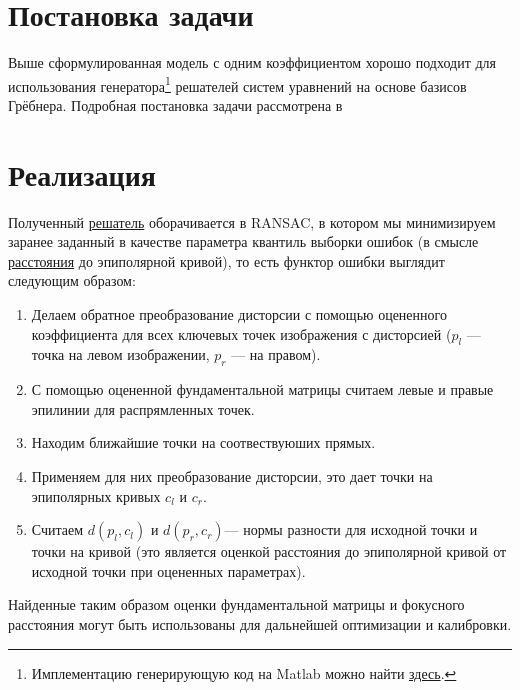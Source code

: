 \label{groebner}
\section{Постановка задачи}

Выше сформулированная модель с одним коэффициентом хорошо подходит для использования генератора\footnote{ Имплементацию генерирующую код на Matlab можно найти \href{https://github.com/PavelTrutman/Automatic-Generator}{здесь}.} решателей систем уравнений на основе базисов Грёбнера. Подробная постановка задачи рассмотрена в \cite[p.~121-149]{KukelovaPhD}


\section{Реализация}

Полученный \href{https://github.com/QuantumMechanicus/camera_calibration/blob/dev/subroutines/distortion_groebner_estimator/Groebner_Estimator.cpp#L125}{решатель} оборачивается в RANSAC, в котором мы минимизируем заранее заданный в качестве параметра квантиль выборки ошибок (в смысле \href{https://github.com/QuantumMechanicus/camera_calibration/blob/dev/core/utils/Functors.h#L11}{расстояния} до эпиполярной кривой), то есть функтор ошибки выглядит следующим образом:
\begin{enumerate}
	\item Делаем обратное преобразование дисторсии с помощью оцененного коэффициента для всех ключевых точек изображения с дисторсией ($p_l$ --- точка на левом изображении, $p_r$ --- на правом).
	\item С помощью оцененной фундаментальной  матрицы считаем левые и правые эпилинии для распрямленных точек.
	\item Находим ближайшие точки на соотвествуюших прямых.
	\item Применяем для них преобразование дисторсии, это дает точки на эпиполярных кривых $c_l$ и $c_r$.
	\item Считаем $d\left(p_l, c_l\right)$ и $d\left(p_r, c_r\right)$--- нормы разности для исходной точки и точки на кривой (это является оценкой расстояния до эпиполярной кривой от исходной точки при оцененных параметрах). 
\end{enumerate}

Найденные таким образом оценки фундаментальной матрицы и фокусного расстояния могут быть использованы для дальнейшей оптимизации и калибровки. 